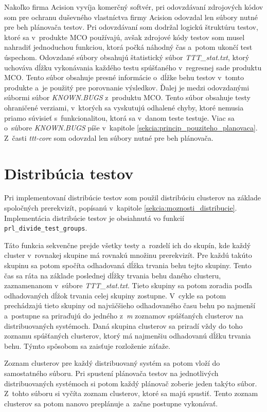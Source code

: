 Nakoľko firma Acision vyvíja komerčný softvér, pri odovzdávaní zdrojových 
kódov  som pre ochranu duševného vlastníctva firmy Acision odovzdal len 
súbory nutné pre beh plánovača testov. 
Pri odovzdávaní som dodržal logickú štruktúru testov, ktoré sa
v~produkte MCO používajú, avšak zdrojové kódy testov som musel nahradiť 
jednoduchou funkciou, ktorá počká náhodný čas a~potom ukončí test úspechom.
Odovzdané súbory obsahujú štatistický súbor \textit{TTT\_stat.txt}, 
ktorý uchováva dĺžku vykonávania každého testu spúšťaného v~regresnej 
sade produktu MCO. Tento súbor obsahuje presné informácie o~dĺžke
behu testov v~tomto produkte a~je použitý pre porovnanie výsledkov.
Ďalej je medzi odovzdanými súbormi súbor \textit{KNOWN.BUGS} z~produktu MCO. 
Tento súbor obsahuje testy ohraničené verziami, v~ktorých sa vyskutujú 
odhalené chyby, ktoré nemusia priamo súvisieť s~funkcionalitou, ktorá sa 
v~danom teste testuje. Viac sa o~súbore \textit{KNOWN.BUGS} píše v~kapitole 
\ref{sekcia:princip_pouziteho_planovaca}.
Z~časti \textit{ttt-core} som odovzdal len súbory nutné pre beh plánovača. 

\section{Distribúcia testov}
\label{sekcia:distribucia_testov}
Pri implementovaní distribúcie testov som použil distribúciu clusterov 
na základe spoločných prerekvizít, popísanú v~kapitole 
\ref{sekcia:moznosti_distribucie}.
Implementácia distribúcie testov je obsiahnutá vo funkcií 
\texttt{prl\_divide\_test\_groups}.

Táto funkcia sekvenčne prejde všetky testy a~rozdelí ich do skupín, 
kde každý cluster v~rovnakej skupine má rovnakú množinu prerekvizít. 
Pre každú takúto skupinu sa potom spočíta odhadovaná dĺžka trvania behu tejto skupiny.
Tento čas sa ráta na základe poslednej dĺžky trvania behu daného clusteru, 
zaznamenanom v~súbore \textit{TTT\_stat.txt}.
Tieto skupiny sa potom zoradia podľa odhadovaných dĺžok trvania celej 
skupiny zostupne. V~cykle sa potom prechádzajú tieto skupiny od 
najväčšieho odhadovaného času behu po najmenší a~postupne sa priraďujú 
do jedného z~\emph{m} zoznamov spúšťaných clusterov na distribuovaných systémoch.
Daná skupina clusterov sa priradí vždy do toho zoznamu spúšťaných clusterov, 
ktorý má najmenšiu odhadovanú dĺžku trvania behu. 
Týmto spôsobom sa zaisťuje rozloženie záťaže. 

Zoznam clusterov pre každý distribuovaný systém sa potom vloží do 
samostatného súboru. Pri spustení plánovača testov na jednotlivých 
distribuovaných systémoch si potom každý plánovač zoberie jeden 
takýto súbor. Z~tohto súboru si vyčíta zoznam clusterov, ktoré sa 
majú spustiť. Tento zoznam clusterov sa potom nanovo preplánuje a~začne 
postupne vykonávať.

